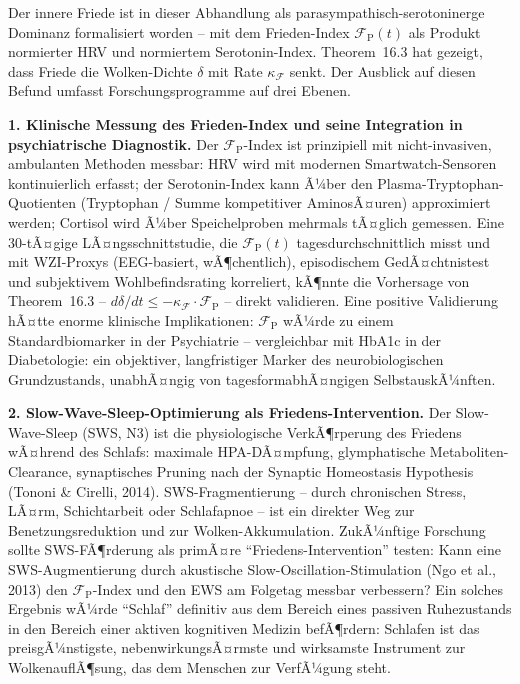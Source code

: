 ﻿\documentclass[12pt,a4paper]{report}
\theoremstyle{plain}
\theoremstyle{definition}
\theoremstyle{remark}
\begin{document}
	Der innere Friede ist in dieser Abhandlung als parasympathisch-serotoninerge
	Dominanz formalisiert worden -- mit dem Frieden-Index $\mathcal{F}_{\mathrm{P}}(t)$
	als Produkt normierter HRV und normiertem Serotonin-Index.
	Theorem~16.3 hat gezeigt, dass Friede die Wolken-Dichte $\delta$
	mit Rate $\kappa_\mathcal{F}$ senkt. Der Ausblick auf diesen Befund
	umfasst Forschungsprogramme auf drei Ebenen.

	\textbf{1. Klinische Messung des Frieden-Index und seine Integration
		in psychiatrische Diagnostik.}
	Der $\mathcal{F}_{\mathrm{P}}$-Index ist prinzipiell mit
	nicht-invasiven, ambulanten Methoden messbar:
	HRV wird mit modernen Smartwatch-Sensoren kontinuierlich erfasst;
	der Serotonin-Index kann Ã¼ber den Plasma-Tryptophan-Quotienten
	(Tryptophan / Summe kompetitiver AminosÃ¤uren) approximiert werden;
	Cortisol wird Ã¼ber Speichelproben mehrmals tÃ¤glich gemessen.
	Eine 30-tÃ¤gige LÃ¤ngsschnittstudie, die $\mathcal{F}_{\mathrm{P}}(t)$
	tagesdurchschnittlich misst und mit WZI-Proxys (EEG-basiert,
	wÃ¶chentlich), episodischem GedÃ¤chtnistest und subjektivem
	Wohlbefindsrating korreliert, kÃ¶nnte die Vorhersage von
	Theorem~16.3 -- $d\delta/dt \leq -\kappa_\mathcal{F} \cdot \mathcal{F}_{\mathrm{P}}$ --
	direkt validieren.
	Eine positive Validierung hÃ¤tte enorme klinische Implikationen:
	$\mathcal{F}_{\mathrm{P}}$ wÃ¼rde zu einem Standardbiomarker
	in der Psychiatrie -- vergleichbar mit HbA1c in der Diabetologie:
	ein objektiver, langfristiger Marker des neurobiologischen
	Grundzustands, unabhÃ¤ngig von tagesformabhÃ¤ngigen SelbstauskÃ¼nften.

	\textbf{2. Slow-Wave-Sleep-Optimierung als Friedens-Intervention.}
	Der Slow-Wave-Sleep (SWS, N3) ist die physiologische VerkÃ¶rperung
	des Friedens wÃ¤hrend des Schlafs: maximale HPA-DÃ¤mpfung,
	glymphatische Metaboliten-Clearance, synaptisches Pruning
	nach der Synaptic Homeostasis Hypothesis (Tononi \& Cirelli, 2014).
	SWS-Fragmentierung -- durch chronischen Stress, LÃ¤rm, Schicht\-arbeit
	oder Schlafapnoe -- ist ein direkter Weg zur Benetzungsreduktion und
	zur Wolken-Akkumulation.
	ZukÃ¼nftige Forschung sollte SWS-FÃ¶rderung als primÃ¤re
	``Friedens-Intervention'' testen: Kann eine SWS-Augmentierung
	durch akustische Slow-Oscillation-Stimulation (Ngo et al., 2013)
	den $\mathcal{F}_{\mathrm{P}}$-Index und den EWS am Folgetag
	messbar verbessern?
	Ein solches Ergebnis wÃ¼rde ``Schlaf'' definitiv aus dem Bereich
	eines passiven Ruhezustands in den Bereich einer aktiven
	kognitiven Medizin befÃ¶rdern: Schlafen ist das preisgÃ¼nstigste,
	nebenwirkungsÃ¤rmste und wirksamste Instrument zur
	WolkenauflÃ¶sung, das dem Menschen zur VerfÃ¼gung steht.
\end{document}
